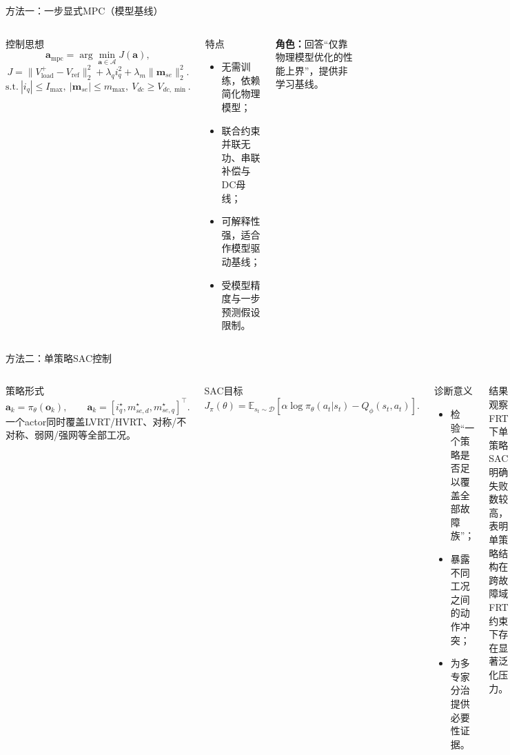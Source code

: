 \documentclass[10pt,aspectratio=169,mathserif]{beamer}
\begin{document}
\begin{frame}{方法一：一步显式MPC（模型基线）}
\begin{columns}[T,onlytextwidth]
\begin{block}{控制思想}
\[
\bm a_{\mathrm{mpc}}=\arg\min_{\bm a\in\mathcal A} J(\bm a),
\]
\[
J=\big\|V_{\mathrm{load}}^{+}-V_{\mathrm{ref}}\big\|_2^2
+\lambda_q i_q^2+\lambda_m\|\bm m_{se}\|_2^2 .
\]
\[
\mathrm{s.t.}\ |i_q|\le I_{\max},\ |\bm m_{se}|\le m_{\max},\ V_{dc}\ge V_{dc,\min}.
\]
\end{block}

\begin{block}{特点}
\begin{itemize}
  \item 无需训练，依赖简化物理模型；
  \item 联合约束并联无功、串联补偿与DC母线；
  \item 可解释性强，适合作模型驱动基线；
  \item 受模型精度与一步预测假设限制。
\end{itemize}
\end{block}

\medskip
\textbf{角色：}回答“仅靠物理模型优化的性能上界”，提供非学习基线。
\end{columns}
\end{frame}

\begin{frame}{方法二：单策略SAC控制}
\begin{columns}[T,onlytextwidth]
\begin{block}{策略形式}
\[
\bm a_k=\pi_{\theta}(\bm o_k),
\qquad
\bm a_k=[i_q^\star,m_{se,d}^\star,m_{se,q}^\star]^\top .
\]
一个actor同时覆盖LVRT/HVRT、对称/不对称、弱网/强网等全部工况。
\end{block}

\begin{block}{SAC目标}
\[
J_\pi(\theta)=
\mathbb E_{s_t\sim\mathcal D}
\left[
\alpha\log\pi_\theta(a_t|s_t)
-Q_\phi(s_t,a_t)
\right].
\]
\end{block}

\begin{block}{诊断意义}
\begin{itemize}
  \item 检验“一个策略是否足以覆盖全部故障族”；
  \item 暴露不同工况之间的动作冲突；
  \item 为多专家分治提供必要性证据。
\end{itemize}
\end{block}

\begin{block}{结果观察}
FRT下单策略SAC明确失败数较高，表明单策略结构在跨故障域FRT约束下存在显著泛化压力。
\end{block}
\end{columns}
\end{frame}
\end{document}
